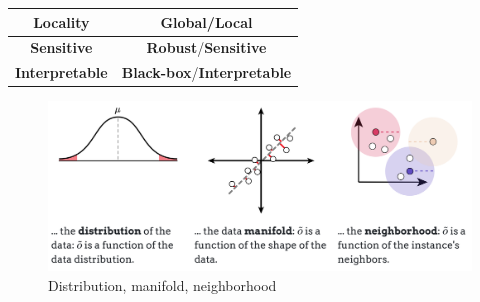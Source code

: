 \begin{table}
   \begin{tabular}{|c|c|}
      \textbf{Locality} & \textbf{Global}/\textbf{Local} \\
      \hline
      \textbf{Sensitive} & \textbf{Robust}/\textbf{Sensitive} \\
      \hline
      \textbf{Interpretable} & \textbf{Black-box}/\textbf{Interpretable} \\
   \end{tabular}
\end{table}

\begin{figure}[htbp]
   \centering
   \includegraphics{images/06/outlierfunction}
   \caption{Distribution, manifold, neighborhood}
   \label{fig:}
\end{figure}

